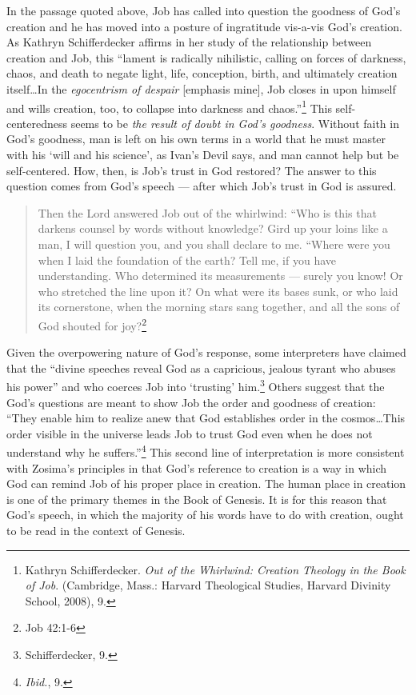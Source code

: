 In the passage quoted above, Job has called into question the goodness of God's creation and he has moved into a posture of ingratitude vis-a-vis God's creation. As Kathryn Schifferdecker affirms in her study of the relationship between creation and Job, this ``lament is radically nihilistic, calling on forces of darkness, chaos, and death to negate light, life, conception, birth, and ultimately creation itself\ldots In the \emph{egocentrism of despair} [emphasis mine], Job closes in upon himself and wills creation, too, to collapse into darkness and chaos.''\footnote{Kathryn Schifferdecker. \emph{Out of the Whirlwind: Creation Theology in the Book of Job}. (Cambridge, Mass.: Harvard Theological Studies, Harvard Divinity School, 2008), 9.} This self-centeredness seems to be \emph{the result of doubt in God's goodness}. Without faith in God's goodness, man is left on his own terms in a world that he must master with his `will and his science', as Ivan's Devil says, and man cannot help but be self-centered. How, then, is Job's trust in God restored? The answer to this question comes from God's speech --- after which Job's trust in God is assured.

\begin{quote}
\singlespacing
Then the Lord answered Job out of the whirlwind: ``Who is this that darkens counsel by words without knowledge? Gird up your loins like a man, I will question you, and you shall declare to me. ``Where were you when I laid the foundation of the earth? Tell me, if you have understanding. Who determined its measurements --- surely you know! Or who stretched the line upon it? On what were its bases sunk, or who laid its cornerstone, when the morning stars sang together, and all the sons of God shouted for joy?\footnote{Job 42:1-6}
\end{quote}

Given the overpowering nature of God's response, some interpreters have claimed that the ``divine speeches reveal God as a capricious, jealous tyrant who abuses his power'' and who coerces Job into `trusting' him.\footnote{Schifferdecker, 9.} Others suggest that the God's questions are meant to show Job the order and goodness of creation: ``They enable him to realize anew that God establishes order in the cosmos\ldots This order visible in the universe leads Job to trust God even when he does not understand why he suffers.''\footnote{\emph{Ibid.}, 9.} This second line of interpretation is more consistent with Zosima's principles in that God's reference to creation is a way in which God can remind Job of his proper place in creation. The human place in creation is one of the primary themes in the Book of Genesis. It is for this reason that God's speech, in which the majority of his words have to do with creation, ought to be read in the context of Genesis.


